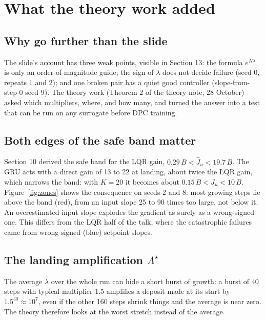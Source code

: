 \documentclass[11pt]{article}
\begin{document}
\section{What the theory work added}

\subsection{Why go further than the slide}

The slide's account has three weak points, visible in Section 13: the formula $e^{N\lambda}$ is only an order-of-magnitude guide; the sign of $\lambda$ does not decide failure (seed 0, repeats 1 and 2); and one broken pair has a quiet good controller (slope-from-step-0 seed 9). The theory work (Theorem 2 of the theory note, 28 October) asked which multipliers, where, and how many, and turned the answer into a test that can be run on any surrogate before DPC training.

\subsection{Both edges of the safe band matter}

Section 10 derived the safe band for the LQR gain, $0.29\,B<\hat J_u<19.7\,B$. The GRU acts with a direct gain of 13 to 22 at landing, about twice the LQR gain, which narrows the band: with $K=20$ it becomes about $0.15\,B<\hat J_u<10\,B$. Figure~\ref{fig:zones} shows the consequence on seeds 2 and 8: most growing steps lie above the band (red), from an input slope 25 to 90 times too large, not below it. An overestimated input slope explodes the gradient as surely as a wrong-signed one. This differs from the LQR half of the talk, where the catastrophic failures came from wrong-signed (blue) setpoint slopes.

\subsection{The landing amplification $\Lambda^\star$}

The average $\lambda$ over the whole run can hide a short burst of growth: a burst of 40 steps with typical multiplier 1.5 amplifies a deposit made at its start by $1.5^{40}\approx10^7$, even if the other 160 steps shrink things and the average is near zero. The theory therefore looks at the worst stretch instead of the average.
\end{document}
